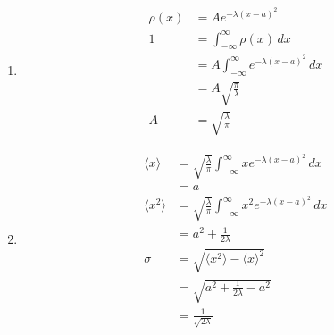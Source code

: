 \documentclass{article}
\begin{document}
\subsection{}

\begin{enumerate}
  \item

        \begin{align*}
          \rho(x) & = A e^{-\lambda (x - a)^2}                             \\
          1       & = \int_{-\infty}^\infty \rho(x) \,d x                  \\
                  & = A \int_{-\infty}^\infty e^{-\lambda (x - a)^2} \,d x \\
                  & = A \sqrt{\frac{\pi}{\lambda}}                         \\
          A       & = \sqrt{\frac{\lambda}{\pi}}
        \end{align*}

  \item

        \begin{align*}
          \langle x \rangle   & = \sqrt{\frac{\lambda}{\pi}} \int_{-\infty}^\infty x e^{-\lambda (x - a)^2} \,d x   \\
                              & = a                                                                                 \\
          \langle x^2 \rangle & = \sqrt{\frac{\lambda}{\pi}} \int_{-\infty}^\infty x^2 e^{-\lambda (x - a)^2} \,d x \\
                              & = a^2 + \frac{1}{2 \lambda}                                                         \\
          \sigma              & = \sqrt{\langle x^2 \rangle - \langle x \rangle^2}                                  \\
                              & = \sqrt{a^2 + \frac{1}{2 \lambda} - a^2}                                            \\
                              & = \frac{1}{\sqrt{2 \lambda}}
        \end{align*}
\end{enumerate}

\subsection{}
\end{document}
